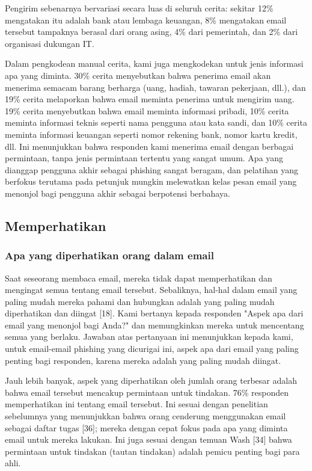 \documentclass[lettersize,journal]{IEEEtran}
\begin{document}
Pengirim sebenarnya bervariasi secara luas di seluruh cerita: sekitar 12\%
mengatakan itu adalah bank atau lembaga keuangan, 8\% mengatakan email tersebut
tampaknya berasal dari orang asing, 4\% dari pemerintah, dan 2\% dari
organisasi dukungan IT.

Dalam pengkodean manual cerita, kami juga mengkodekan untuk jenis informasi apa
yang diminta. 30\% cerita menyebutkan bahwa penerima email akan menerima
semacam barang berharga (uang, hadiah, tawaran pekerjaan, dll.), dan 19\%
cerita melaporkan bahwa email meminta penerima untuk mengirim uang. 19\% cerita
menyebutkan bahwa email meminta informasi pribadi, 10\% cerita meminta
informasi teknis seperti nama pengguna atau kata sandi, dan 10\% cerita meminta
informasi keuangan seperti nomor rekening bank, nomor kartu kredit, dll. Ini
menunjukkan bahwa responden kami menerima email dengan berbagai permintaan,
tanpa jenis permintaan tertentu yang sangat umum. Apa yang dianggap pengguna
akhir sebagai phishing sangat beragam, dan pelatihan yang berfokus terutama
pada petunjuk mungkin melewatkan kelas pesan email yang menonjol bagi pengguna
akhir sebagai berpotensi berbahaya.

\subsection{Memperhatikan}

\subsubsection{Apa yang diperhatikan orang dalam email}

Saat seseorang membaca email, mereka tidak dapat memperhatikan dan mengingat
semua tentang email tersebut. Sebaliknya, hal-hal dalam email yang paling mudah
mereka pahami dan hubungkan adalah yang paling mudah diperhatikan dan diingat
  [18]. Kami bertanya kepada responden "Aspek apa dari email yang menonjol bagi
Anda?" dan memungkinkan mereka untuk mencentang semua yang berlaku. Jawaban
atas pertanyaan ini menunjukkan kepada kami, untuk email-email phishing yang
dicurigai ini, aspek apa dari email yang paling penting bagi responden, karena
mereka adalah yang paling mudah diingat.

Jauh lebih banyak, aspek yang diperhatikan oleh jumlah orang terbesar adalah
bahwa email tersebut mencakup permintaan untuk tindakan. 76\% responden
memperhatikan ini tentang email tersebut. Ini sesuai dengan penelitian
sebelumnya yang menunjukkan bahwa orang cenderung menggunakan email sebagai
daftar tugas [36]; mereka dengan cepat fokus pada apa yang diminta email untuk
mereka lakukan. Ini juga sesuai dengan temuan Wash [34] bahwa permintaan untuk
tindakan (tautan tindakan) adalah pemicu penting bagi para ahli.
\end{document}
